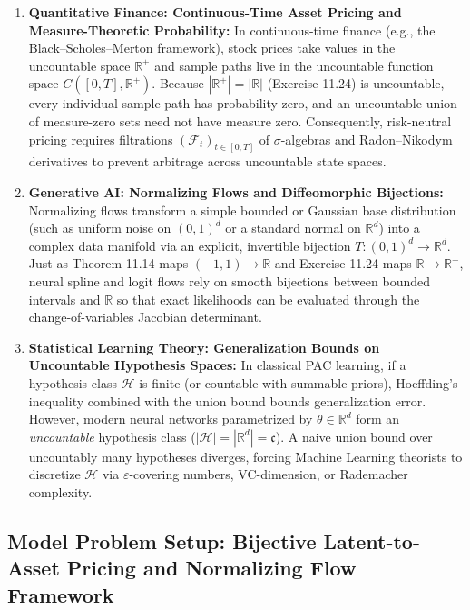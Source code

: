 \documentclass[11pt, letterpaper]{article}
\theoremstyle{definition}
\theoremstyle{remark}
\begin{document}
\begin{enumerate}[label=\textbf{\arabic*.}]
    \item \textbf{Quantitative Finance: Continuous-Time Asset Pricing and Measure-Theoretic Probability:}
    In continuous-time finance (e.g., the Black--Scholes--Merton framework), stock prices take values in the uncountable space $\mathbb{R}^+$ and sample paths live in the uncountable function space $C([0, T], \mathbb{R}^+)$. Because $|\mathbb{R}^+| = |\mathbb{R}|$ (Exercise 11.24) is uncountable, every individual sample path has probability zero, and an uncountable union of measure-zero sets need not have measure zero. Consequently, risk-neutral pricing requires filtrations $(\mathcal{F}_t)_{t \in [0, T]}$ of $\sigma$-algebras and Radon--Nikodym derivatives to prevent arbitrage across uncountable state spaces.

    \item \textbf{Generative AI: Normalizing Flows and Diffeomorphic Bijections:}
    Normalizing flows transform a simple bounded or Gaussian base distribution (such as uniform noise on $(0, 1)^d$ or a standard normal on $\mathbb{R}^d$) into a complex data manifold via an explicit, invertible bijection $T : (0, 1)^d \to \mathbb{R}^d$. Just as Theorem 11.14 maps $(-1, 1) \to \mathbb{R}$ and Exercise 11.24 maps $\mathbb{R} \to \mathbb{R}^+$, neural spline and logit flows rely on smooth bijections between bounded intervals and $\mathbb{R}$ so that exact likelihoods can be evaluated through the change-of-variables Jacobian determinant.

    \item \textbf{Statistical Learning Theory: Generalization Bounds on Uncountable Hypothesis Spaces:}
    In classical PAC learning, if a hypothesis class $\mathcal{H}$ is finite (or countable with summable priors), Hoeffding's inequality combined with the union bound bounds generalization error. However, modern neural networks parametrized by $\theta \in \mathbb{R}^d$ form an \emph{uncountable} hypothesis class ($|\mathcal{H}| = |\mathbb{R}^d| = \mathfrak{c}$). A naive union bound over uncountably many hypotheses diverges, forcing Machine Learning theorists to discretize $\mathcal{H}$ via $\varepsilon$-covering numbers, VC-dimension, or Rademacher complexity.
\end{enumerate}

\subsection{Model Problem Setup: Bijective Latent-to-Asset Pricing and Normalizing Flow Framework}
\end{document}
